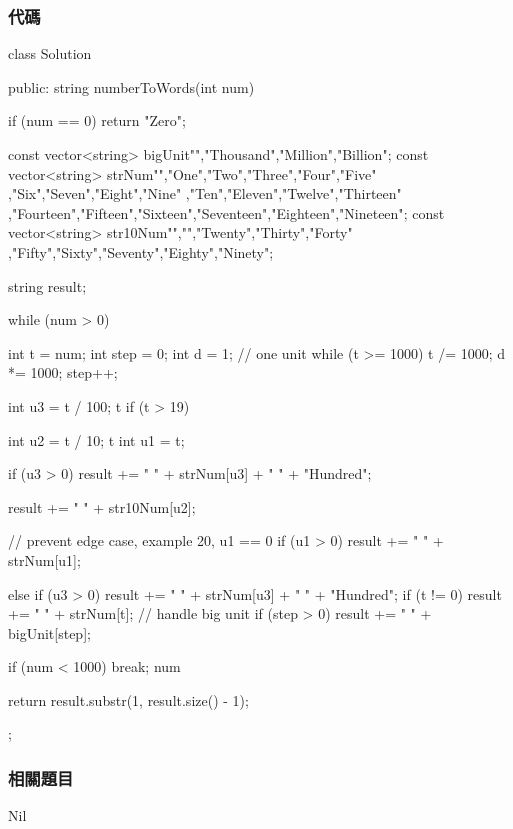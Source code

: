 \subsubsection{代碼}
\begin{Code}
class Solution
{
public:
    string numberToWords(int num) {
        if (num == 0) return "Zero";

        const vector<string> bigUnit{"","Thousand","Million","Billion"};
        const vector<string> strNum{"","One","Two","Three","Four","Five"
          ,"Six","Seven","Eight","Nine"
          ,"Ten","Eleven","Twelve","Thirteen"
          ,"Fourteen","Fifteen","Sixteen","Seventeen","Eighteen","Nineteen"};
        const vector<string> str10Num{"","","Twenty","Thirty","Forty"
          ,"Fifty","Sixty","Seventy","Eighty","Ninety"};

        string result;

        while (num > 0) {
            int t = num;
            int step = 0;
            int d = 1;  // one unit
            while (t >= 1000) {
                t /= 1000;
                d *= 1000;
                step++;
            }

            int u3 = t / 100; t %
            if (t > 19) {
                int u2 = t / 10; t %
                int u1 = t;

                if (u3 > 0)
                    result += " " + strNum[u3] + " " + "Hundred";

                result += " " + str10Num[u2];

                // prevent edge case, example 20, u1 == 0
                if (u1 > 0) result += " " + strNum[u1];
            }
            else {
                if (u3 > 0)
                    result += " " + strNum[u3] + " " + "Hundred";
                if (t != 0)
                    result += " " + strNum[t];
            }
            // handle big unit
            if (step > 0) result += " " + bigUnit[step];

            if (num < 1000) break;
            num %
        }

        return result.substr(1, result.size() - 1);
    }
};
\end{Code}


\subsubsection{相關題目}
Nil
